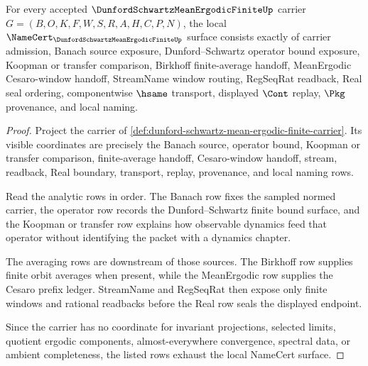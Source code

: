 \begin{theorem}
\label{thm:dunford-schwartz-mean-ergodic-finite-namecert-obligations}
For every accepted $\DunfordSchwartzMeanErgodicFiniteUp$ carrier $G=(B,O,K,F,W,S,R,A,H,C,P,N)$, the local $\NameCert_{\DunfordSchwartzMeanErgodicFiniteUp}$ surface consists exactly of carrier admission, Banach source exposure, Dunford--Schwartz operator bound exposure, Koopman or transfer comparison, Birkhoff finite-average handoff, MeanErgodic Cesaro-window handoff, StreamName window routing, RegSeqRat readback, Real seal ordering, componentwise $\hsame$ transport, displayed $\Cont$ replay, $\Pkg$ provenance, and local naming.
\end{theorem}
\begin{proof}
Project the carrier of \autoref{def:dunford-schwartz-mean-ergodic-finite-carrier}. Its visible coordinates are precisely the Banach source, operator bound, Koopman or transfer comparison, finite-average handoff, Cesaro-window handoff, stream, readback, Real boundary, transport, replay, provenance, and local naming rows.

Read the analytic rows in order. The Banach row fixes the sampled normed carrier, the operator row records the Dunford--Schwartz finite bound surface, and the Koopman or transfer row explains how observable dynamics feed that operator without identifying the packet with a dynamics chapter.

The averaging rows are downstream of those sources. The Birkhoff row supplies finite orbit averages when present, while the MeanErgodic row supplies the Cesaro prefix ledger. StreamName and RegSeqRat then expose only finite windows and rational readbacks before the Real row seals the displayed endpoint.

Since the carrier has no coordinate for invariant projections, selected limits, quotient ergodic components, almost-everywhere convergence, spectral data, or ambient completeness, the listed rows exhaust the local NameCert surface.
\end{proof}

